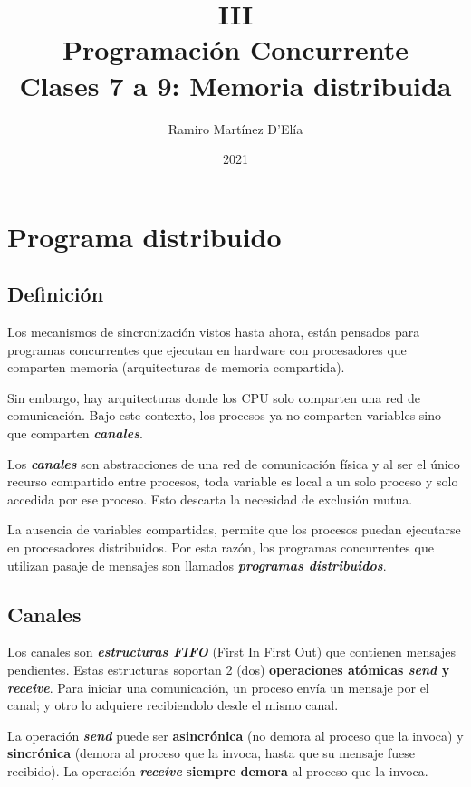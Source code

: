 \documentclass[a4paper, 10pt]{report}
\begin{document}
\title{
    III\\
    Programación Concurrente\\
    \large Clases 7 a 9: Memoria distribuida
}
\author{Ramiro Martínez D'Elía}
\date{2021}
\maketitle

\tableofcontents

\chapter{Programa distribuido}

\section{Definición}

Los mecanismos de sincronización vistos hasta ahora, están pensados para programas concurrentes que ejecutan en hardware con procesadores que comparten memoria (arquitecturas de memoria compartida).

Sin embargo, hay arquitecturas donde los CPU solo comparten una red de comunicación. Bajo este contexto, los procesos ya no comparten variables sino que comparten \textbf{\emph{canales}}.

Los \textbf{\emph{canales}} son abstracciones de una red de comunicación física y al ser el único recurso compartido entre procesos, toda variable es local a un solo proceso y solo accedida por ese proceso. Esto descarta la necesidad de exclusión mutua.

La ausencia de variables compartidas, permite que los procesos puedan ejecutarse en procesadores distribuidos. Por esta razón, los programas concurrentes que utilizan pasaje de mensajes son llamados \textbf{\emph{programas distribuidos}}.

\section{Canales}

Los canales son \textbf{\emph{estructuras FIFO}} (First In First Out) que contienen mensajes pendientes. Estas estructuras soportan 2 (dos) \textbf{operaciones atómicas \emph{send} y \emph{receive}}. Para iniciar una comunicación, un proceso envía un mensaje por el canal; y otro lo adquiere recibiendolo desde el mismo canal.

La operación \textbf{\emph{send}} puede ser \textbf{asincrónica} (no demora al proceso que la invoca) y \textbf{sincrónica} (demora al proceso que la invoca, hasta que su mensaje fuese recibido). La operación \textbf{\emph{receive}} \textbf{siempre demora} al proceso que la invoca.
\end{document}
